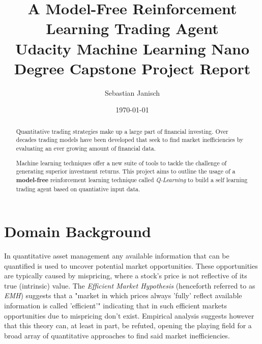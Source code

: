 \documentclass[dvips,12pt]{article}
\begin{document}

\title{A Model-Free Reinforcement Learning Trading Agent \\ \large Udacity Machine Learning Nano Degree Capstone Project Report}

\author{Sebastian Janisch}
\date{\today}



\maketitle


\begin{abstract}
Quantitative trading strategies make up a large part of financial investing. Over decades trading models have been developed that seek to find market inefficiencies by evaluating an ever growing amount of financial data. 

Machine learning techniques offer a new suite of tools to tackle the challenge of generating superior investment returns. This project aims to outline the usage of a \textbf{model-free} reinforcement learning technique called \emph{Q-Learning} to build a self learning trading agent based on quantiative input data.
\end{abstract}

\section{Domain Background}
In quantitative asset management any available information that can be quantified is used to uncover potential market opportunities. 
These opportunities are typically caused by mispricing, where a stock's price is not reflective of its true (intrinsic) value. 
The \emph{Efficient Market Hypothesis} (henceforth referred to as \emph{EMH}) suggests that a "market in which prices always 'fully' reflect available information is called 'efficient'"\cite{fama1970} indicating that in such efficient markets opportunities due to mispricing don't exist. 
Empirical analysis suggests however that this theory can, at least in part, be refuted\cite{sewell2012}, opening the playing field for a broad array of quantitative approaches to find said market inefficiencies.
\end{document}
